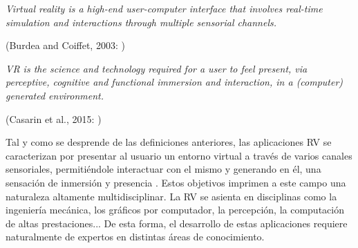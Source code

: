 \begin{center}
    \begin{minipage}{0.9\linewidth}
        {\small
\emph{Virtual reality is a high-end user-computer interface that
involves real-time simulation and interactions through
multiple sensorial channels.}
        }
        \begin{flushright}
            (Burdea and Coiffet, 2003: \cite{burdea2003virtual})
        \end{flushright}
    \end{minipage}
    
    \begin{minipage}{0.9\linewidth}
        {\small
\emph{VR is the science and technology required for a user
to feel present, via perceptive, cognitive and functional
immersion and interaction, in a (computer) generated
environment. }
        }
        \begin{flushright}
            (Casarin et al., 2015: \cite{kuntz2015middlevr})
        \end{flushright}
    \end{minipage}
    
\end{center}
%
Tal y como se desprende de las definiciones anteriores, las aplicaciones \ac{RV} se caracterizan por presentar al usuario un entorno virtual a través de varios canales sensoriales, permitiéndole interactuar con el mismo y generando en él, una sensación de inmersión y presencia \cite{Jerald:2015}. Estos objetivos imprimen a este campo una naturaleza altamente multidisciplinar. La \ac{RV} se asienta en disciplinas como la ingeniería mecánica, los gráficos por computador, la percepción, la computación de altas prestaciones... De esta forma, el desarrollo de estas aplicaciones requiere naturalmente de expertos en distintas áreas de conocimiento.  

